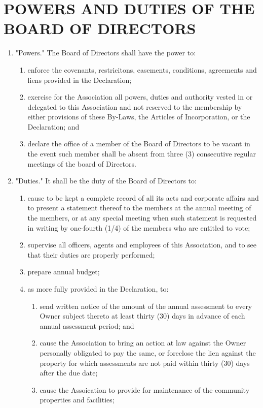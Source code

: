 \documentclass[12pt, letterpaper]{article}
\begin{document}
\section{POWERS AND DUTIES OF THE BOARD OF DIRECTORS}
\begin{enumerate}
 \item "Powers."
  The Board of Directors shall have the power to:
  \begin{enumerate}
   \item enforce the covenants, restricitons, easements, conditions, agreements and liens provided in the Declaration;
   \item exercise for the Association all powers, duties and authority vested in or delegated to this Association and not reserved to the membership by either provisions of these By-Laws, the Articles of Incorporation, or the Declaration; and
   \item declare the office of a member of the Board of Directors to be vacant in the event such member shall be absent from three (3) consecutive regular meetings of the board of Directors.
  \end{enumerate}
 \item "Duties."
  It shall be the duty of the Board of Directors to:
  \begin{enumerate}
   \item cause to be kept a complete record of all its acts and corporate affairs and to present a statement thereof to the members at the annual meeting of the members, or at any special meeting when such statement is requested in writing by one-fourth (1/4) of the members who are entitled to vote;
   \item supervise all officers, agents and employees of this Association, and to see that their duties are properly performed;
   \item prepare annual budget;
   \item as more fully provided in the Declaration, to:
   \begin{enumerate}
    \item send written notice of the amount of the annual assessment to every Owner subject thereto at least thirty (30) days in advance of each annual assessment period; and
    \item cause the Association to bring an action at law against the Owner personally obligated to pay the same, or foreclose the lien against the property for which assessments are not paid within thirty (30) days after the due date;
    \item cause the Assoication to provide for maintenance of the community properties and facilities;

\end{enumerate}
\end{enumerate}
\end{enumerate}
\end{document}
